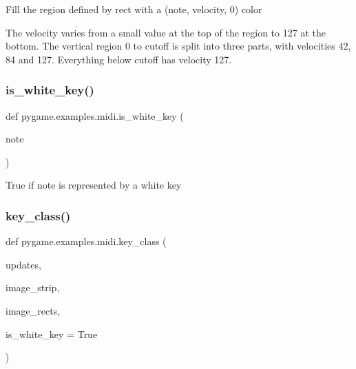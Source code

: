 \begin{DoxyVerb}Fill the region defined by rect with a (note, velocity, 0) color

The velocity varies from a small value at the top of the region to
127 at the bottom. The vertical region 0 to cutoff is split into
three parts, with velocities 42, 84 and 127. Everything below cutoff
has velocity 127.\end{DoxyVerb}
 \mbox{\label{namespacepygame_1_1examples_1_1midi_a6f297edb18a87cbad5dffd2cab7903f7}} 
\subsubsection{\texorpdfstring{is\+\_\+white\+\_\+key()}{is\_white\_key()}}
{\footnotesize\ttfamily def pygame.\+examples.\+midi.\+is\+\_\+white\+\_\+key (\begin{DoxyParamCaption}\item[{}]{note }\end{DoxyParamCaption})}

\begin{DoxyVerb}True if note is represented by a white key\end{DoxyVerb}
 \mbox{\label{namespacepygame_1_1examples_1_1midi_a6847638ad406203f6e1595bc910326d0}} 
\subsubsection{\texorpdfstring{key\+\_\+class()}{key\_class()}}
{\footnotesize\ttfamily def pygame.\+examples.\+midi.\+key\+\_\+class (\begin{DoxyParamCaption}\item[{}]{updates,  }\item[{}]{image\+\_\+strip,  }\item[{}]{image\+\_\+rects,  }\item[{}]{is\+\_\+white\+\_\+key = {\ttfamily True} }\end{DoxyParamCaption})}

